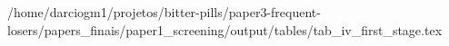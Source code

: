 /home/darciogm1/projetos/bitter-pills/paper3-frequent-losers/papers_finais/paper1_screening/output/tables/tab_iv_first_stage.tex
